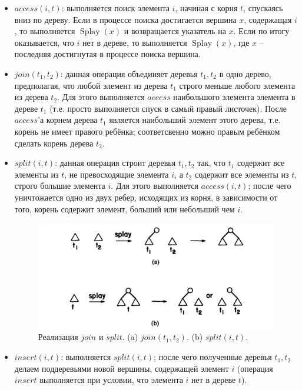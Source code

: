 \documentclass[a4paper,11pt]{article}
\DeclareMathOperator{\splay}{Splay}
\begin{document}
\begin{itemize}
    \item \(access(i, t)\): выполняется поиск элемента \(i\), начиная с корня \(t\), спускаясь вниз по дереву. Если в процессе поиска достигается вершина \(x\), содержащая \(i\), то выполняется \(\splay(x)\) и возвращается указатель на \(x\). Если по итогу оказывается, что \(i\) нет в дереве, то выполняется \(\splay(x)\), где \(x\) -- последняя достигнутая в процессе поиска вершина.

    \item \(join(t_1, t_2)\): данная операция объединяет деревья \(t_1, t_2\) в одно дерево, предполагая, что любой элемент из дерева \(t_1\) строго меньше любого элемента из дерева \(t_2\). Для этого выполняется \(access\) наибольшого элемента элемента в дереве \(t_1\) (т.е. просто выполняется спуск в самый правый листочек). После \(access\)'а корнем дерева \(t_1\) является наибольший элемент этого дерева, т.е. корень не имеет правого ребёнка; соответсвенно можно правым ребёнком сделать корень дерева \(t_2\).

    \item \(split(i, t)\): данная операция строит деревья \(t_1, t_2\) так, что \(t_1\) содержит все элементы из \(t\), не превосходящие элемента \(i\), а \(t_2\) содержит все элементы из \(t\), строго большие элемента \(i\). Для этого выполняется \(access(i, t)\); после чего уничтожается одно из двух ребер, исходящих из корня, в зависимости от того, корень содержит элемент, больший или небольший чем \(i\).

    \begin{figure}[h] \centering
        \includegraphics[scale=.5]{img/update1.png}
        \caption{Реализация \(join\) и \(split\). (a) \(join(t_1,t_2)\). (b) \(split(i, t)\).}
        \label{fig:update1}
    \end{figure}
    
    \item \(insert(i, t)\): выполняется \(split(i, t)\); после чего полученные деревья \(t_1, t_2\) делаем поддеревьями новой вершины, содержащей элемент \(i\) (операция \(insert\) выполняется при условии, что элемента \(i\) нет в дереве \(t\)).
    

\end{itemize}
\end{document}
